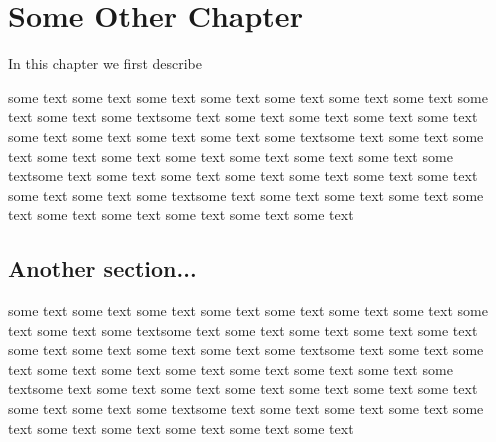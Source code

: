 \chapter{Some Other Chapter}
\label{chap:other}

In this chapter we first describe 

some text some text some text some text some text some text some text
some text some text some textsome text some text some text some text
some text some text some text some text some text some textsome text
some text some text some text some text some text some text some text
some text some textsome text some text some text some text some text
some text some text some text some text some textsome text some text
some text some text some text some text some text some text some text
some text

\section{Another section...}
\label{sec:92183}

some text some text some text some text some text some text some text
some text some text some textsome text some text some text some text
some text some text some text some text some text some textsome text
some text some text some text some text some text some text some text
some text some textsome text some text some text some text some text
some text some text some text some text some textsome text some text
some text some text some text some text some text some text some text
some text


